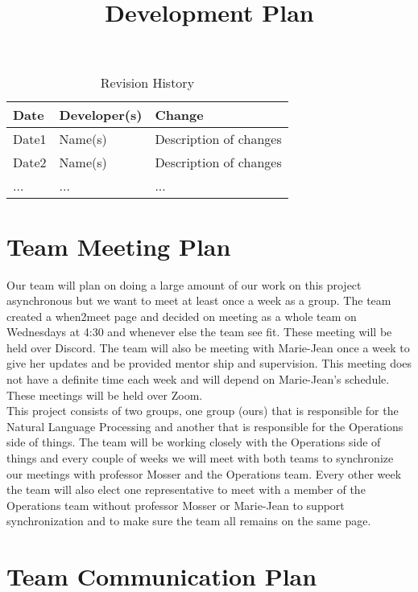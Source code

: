 \documentclass{article}
\title{Development Plan\\\progname}
\author{\authname}
\date{}
\begin{document}
\maketitle

\begin{table}[hp]
\caption{Revision History} \label{TblRevisionHistory}
\begin{tabularx}{\textwidth}{llX}
\toprule
\textbf{Date} & \textbf{Developer(s)} & \textbf{Change}\\
\midrule
Date1 & Name(s) & Description of changes\\
Date2 & Name(s) & Description of changes\\
... & ... & ...\\
\bottomrule
\end{tabularx}
\end{table}


\section{Team Meeting Plan}

Our team will plan on doing a large amount of our work on this project asynchronous but we want to meet at least once a week as a group. The team created a when2meet page and decided on meeting as a whole team on Wednesdays at 4:30 and whenever else the team see fit. These meeting will be held over Discord. The team will also be meeting with Marie-Jean once a week to give her updates and be provided mentor ship and supervision. This meeting does not have a definite time each week and will depend on Marie-Jean's schedule. These meetings will be held over Zoom.\\

This project consists of two groups, one group (ours) that is responsible for the Natural Language Processing and another that is responsible for the Operations side of things. The team will be working closely with the Operations side of things and every couple of weeks we will meet with both teams to synchronize our meetings with professor Mosser and the Operations team. Every other week the team will also elect one representative to meet with a member of the Operations team without professor Mosser or Marie-Jean to support synchronization and to make sure the team all remains on the same page.
\section{Team Communication Plan}
\end{document}
